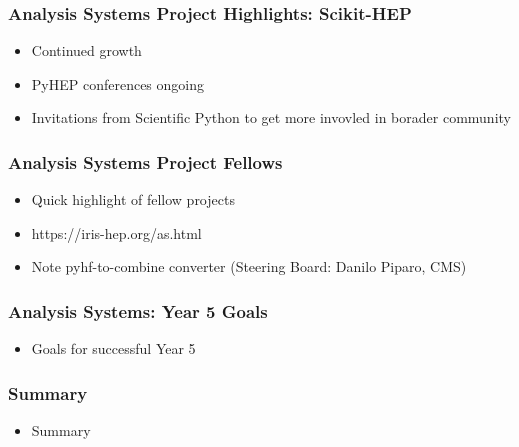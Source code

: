 \begin{frame}
  \frametitle{Analysis Systems Project Highlights: Scikit-HEP}

  \begin{itemize}
    \item Continued growth
    \item PyHEP conferences ongoing
    \item Invitations from Scientific Python to get more invovled in borader community
  \end{itemize}

\end{frame}

\begin{frame}
  \frametitle{Analysis Systems Project Fellows}

  \begin{itemize}
    \item Quick highlight of fellow projects
    \item https://iris-hep.org/as.html
    \item Note pyhf-to-combine converter (Steering Board: Danilo Piparo, CMS)
  \end{itemize}

\end{frame}

\begin{frame}
  \frametitle{Analysis Systems: Year 5 Goals}

  \begin{itemize}
    \item Goals for successful Year 5
  \end{itemize}

\end{frame}

\begin{frame}
  \frametitle{Summary}

  \begin{itemize}
    \item Summary
  \end{itemize}

\end{frame}
